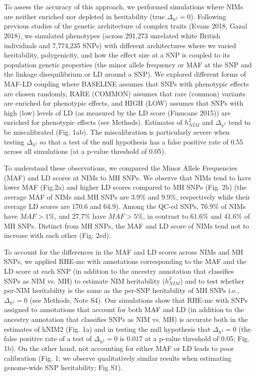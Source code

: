 To assess the accuracy of this approach, we performed simulations where NIMs are neither enriched nor depleted in heritability (true $\Delta_{h^2}=0$). Following previous studies of the genetic architecture of complex traits (Evans 2018, Gazal 2018), we simulated phenotypes (across 291,273 unrelated white British individuals and 7,774,235 SNPs) with different architectures where we varied heritability, polygenicity, and how the effect size at a SNP is coupled to its population genetic properties (the minor allele frequency or MAF at the SNP and the linkage disequilibrium or LD around a SNP). We explored different forms of MAF-LD coupling where BASELINE assumes that SNPs with phenotypic effects are chosen randomly, RARE (COMMON) assumes that rare (common) variants are enriched for phenotypic effects, and HIGH (LOW) assumes that SNPs with high (low) levels of LD (as measured by the LD score (Finucane 2015)) are enriched for phenotypic effects (see Methods). Estimates of $h^2_{NIM}$ and $\Delta_{h^2}$ tend to be miscalibrated (Fig. 1ab). The miscalibration is particularly severe when testing $\Delta_{h^2}$ so that a test of the null hypothesis has a false positive rate of 0.55 across all simulations (at a p-value threshold of 0.05).

To understand these observations, we compared the Minor Allele Frequencies (MAF) and LD scores at NIMs to MH SNPs. We observe that NIMs tend to have lower MAF (Fig.2a) and higher LD scores compared to MH SNPs (Fig. 2b) (the average MAF of NIMs and MH SNPs are 3.9\% and 9.9\%, respectively while their average LD scores are 170.6 and 64.9). Among the QC-ed SNPs, 76.9\% of NIMs have $MAF > 1\%$, and 27.7\% have $MAF > 5\%$, in contrast to 61.6\% and 41.6\% of MH SNPs. Distinct from MH SNPs, the MAF and LD score of NIMs tend not to increase with each other (Fig. 2cd). 

To account for the differences in the MAF and LD scores across NIMs and MH SNPs, we applied RHE-mc with annotations corresponding to the MAF and the LD score at each SNP (in addition to the ancestry annotation that classifies SNPs as NIM vs. MH) to estimate NIM heritability ($h^2_{NIM}$) and to test whether per-NIM heritability is the same as the per-SNP heritability of MH SNPs i.e., $\Delta_{h^2}=0$ (see Methods, Note S4). Our simulations show that RHE-mc with SNPs assigned to annotations that account for both MAF and LD (in addition to the ancestry annotation that classifies SNPs as NIM vs. MH) is accurate both in the estimates of hNIM2 (Fig. 1a) and in testing the null hypothesis that $\Delta_{h^2}=0$ (the false positive rate of a test of $\Delta_{h^2} = 0$  is $0.017$ at a p-value threshold of 0.05; Fig. 1b). On the other hand, not accounting for either MAF or LD leads to poor calibration (Fig. 1; we observe qualitatively similar results when estimating genome-wide SNP heritability; Fig S1).


